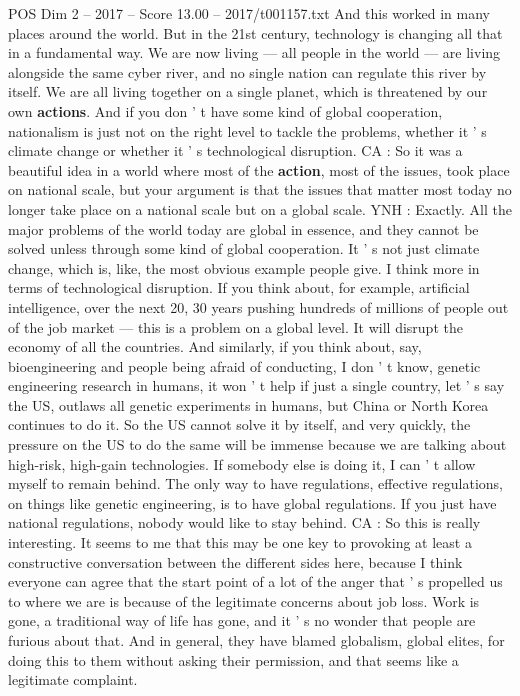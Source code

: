 \begin{textsample}{POS Dim 2 – 2017 – Score 13.00 – 2017/t001157.txt}
And this worked in many places around the world.
But in the 21st century, technology is changing all that in a fundamental way.
We are now living — all people in the world — are living alongside the same cyber river, and no single nation can regulate this river by itself.
We are all living together on a single planet, which is threatened by our own \textbf{actions}.
And if you don ' t have some kind of global cooperation, nationalism is just not on the right level to tackle the problems, whether it ' s climate change or whether it ' s technological disruption.
CA : So it was a beautiful idea in a world where most of the \textbf{action}, most of the issues, took place on national scale, but your argument is that the issues that matter most today no longer take place on a national scale but on a global scale.
YNH : Exactly.
All the major problems of the world today are global in essence, and they cannot be solved unless through some kind of global cooperation.
It ' s not just climate change, which is, like, the most obvious example people give.
I think more in terms of technological disruption.
If you think about, for example, artificial intelligence, over the next 20, 30 years pushing hundreds of millions of people out of the job market — this is a problem on a global level.
It will disrupt the economy of all the countries.
And similarly, if you think about, say, bioengineering and people being afraid of conducting, I don ' t know, genetic engineering research in humans, it won ' t help if just a single country, let ' s say the US, outlaws all genetic experiments in humans, but China or North Korea continues to do it.
So the US cannot solve it by itself, and very quickly, the pressure on the US to do the same will be immense because we are talking about high-risk, high-gain technologies.
If somebody else is doing it, I can ' t allow myself to remain behind.
The only way to have regulations, effective regulations, on things like genetic engineering, is to have global regulations.
If you just have national regulations, nobody would like to stay behind.
CA : So this is really interesting.
It seems to me that this may be one key to provoking at least a constructive conversation between the different sides here, because I think everyone can agree that the start point of a lot of the anger that ' s propelled us to where we are is because of the legitimate concerns about job loss.
Work is gone, a traditional way of life has gone, and it ' s no wonder that people are furious about that.
And in general, they have blamed globalism, global elites, for doing this to them without asking their permission, and that seems like a legitimate complaint.

\end{textsample}
